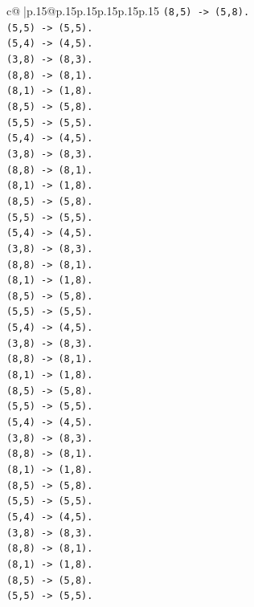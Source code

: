 \documentclass{article}
\begin{document}
{\begin{supertabular}{c@{$\;$}|p{.15\linewidth}@{}p{.15\linewidth}p{.15\linewidth}p{.15\linewidth}p{.15\linewidth}p{.15\linewidth}}
{{{\texttt{(8,5) {-}> (5,8).} \\
\texttt{(5,5) {-}> (5,5).} \\
\texttt{(5,4) {-}> (4,5).} \\
\texttt{(3,8) {-}> (8,3).} \\
\texttt{(8,8) {-}> (8,1).} \\
\texttt{(8,1) {-}> (1,8).} \\
\texttt{(8,5) {-}> (5,8).} \\
\texttt{(5,5) {-}> (5,5).} \\
\texttt{(5,4) {-}> (4,5).} \\
\texttt{(3,8) {-}> (8,3).} \\
\texttt{(8,8) {-}> (8,1).} \\
\texttt{(8,1) {-}> (1,8).} \\
\texttt{(8,5) {-}> (5,8).} \\
\texttt{(5,5) {-}> (5,5).} \\
\texttt{(5,4) {-}> (4,5).} \\
\texttt{(3,8) {-}> (8,3).} \\
\texttt{(8,8) {-}> (8,1).} \\
\texttt{(8,1) {-}> (1,8).} \\
\texttt{(8,5) {-}> (5,8).} \\
\texttt{(5,5) {-}> (5,5).} \\
\texttt{(5,4) {-}> (4,5).} \\
\texttt{(3,8) {-}> (8,3).} \\
\texttt{(8,8) {-}> (8,1).} \\
\texttt{(8,1) {-}> (1,8).} \\
\texttt{(8,5) {-}> (5,8).} \\
\texttt{(5,5) {-}> (5,5).} \\
\texttt{(5,4) {-}> (4,5).} \\
\texttt{(3,8) {-}> (8,3).} \\
\texttt{(8,8) {-}> (8,1).} \\
\texttt{(8,1) {-}> (1,8).} \\
\texttt{(8,5) {-}> (5,8).} \\
\texttt{(5,5) {-}> (5,5).} \\
\texttt{(5,4) {-}> (4,5).} \\
\texttt{(3,8) {-}> (8,3).} \\
\texttt{(8,8) {-}> (8,1).} \\
\texttt{(8,1) {-}> (1,8).} \\
\texttt{(8,5) {-}> (5,8).} \\
\texttt{(5,5) {-}> (5,5).} \\
}}}
\end{supertabular}}
\end{document}

